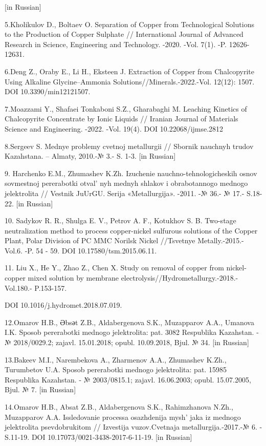 {[}in Russian{]}

5.Kholikulov D., Boltaev O. Separation of Copper from Technological
Solutions to the Production of Copper Sulphate // International Journal
of Advanced Research in Science, Engineering and Technology. -2020.
-Vol. 7(1). -P. 12626-12631.

6.Deng Z., Oraby E., Li H., Eksteen J. Extraction of Copper from
Chalcopyrite Using Alkaline Glycine--Ammonia
Solutions//Minerals.-2022.-Vol. 12(12): 1507. DOI 10.3390/min12121507.

7.Moazzami Y., Shafaei Tonkaboni S.Z., Gharabaghi M. Leaching Kinetics
of Chalcopyrite Concentrate by Ionic Liquids // Iranian Journal of
Materials Science and Engineering. -2022. -Vol. 19(4). DOI
10.22068/ijmse.2812

8.Sergeev S. Mednye problemy cvetnoj metallurgii // Sbornik nauchnyh
trudov Kazahstana. -- Almaty, 2010.-№ 3.- S. 1-3. {[}in Russian{]}

9. Harchenko E.M., Zhumashev K.Zh. Izuchenie nauchno-tehnologicheskih
osnov sovmestnoj pererabotki otval' nyh mednyh shlakov i
obrabotannogo mednogo jelektrolita // Vestnik JuUrGU. Serija
«Metallurgija». -2011. -№ 36.- № 17.- S.18-22. {[}in Russian{]}

10. Sadykov R. R., Shulga E. V., Petrov A. F., Kotukhov S. B. Two-stage
neutralization method to process copper-nickel sulfurous solutions of
the Copper Plant, Polar Division of PC MMC Norilsk Nickel //Tsvetnye
Metally.-2015.- Vol.6. -P. 54 - 59. DOI 10.17580/tsm.2015.06.11.

11. Liu X., He Y., Zhao Z., Chen X. Study on removal of copper from
nickel-copper mixed solution by membrane
electrolysis//Hydrometallurgy.-2018.-Vol.180.- P.153-157.

DOI 10.1016/j.hydromet.2018.07.019.

12.Omarov H.B., Әbsәt Z.B., Aldabergenova S.K., Muzapparov A.A., Umanova
I.K. Sposob pererabotki mednogo jelektrolita: pat. 3082 Respublika
Kazahstan. - № 2018/0029.2; zajavl. 15.01.2018; opubl. 10.09.2018, Bjul.
№ 34. {[}in Russian{]}

13.Bakeev M.I., Narembekova A., Zharmenov A.A., Zhumashev K.Zh.,
Turumbetov U.A. Sposob pererabotki mednogo jelektrolita: pat. 15985
Respublika Kazahstan. - № 2003/0815.1; zajavl. 16.06.2003; opubl.
15.07.2005, Bjul. № 7. {[}in Russian{]}

14.Omarov H.B., Absat Z.B., Aldabergenova S.K., Rahimzhanova N.Zh.,
Muzapparov A.A. Issledovanie processa osazhdenija
mysh' jaka iz mednogo jelektrolita psevdobrukitom //
Izvestija vuzov.Cvetnaja metallurgija.-2017.-№ 6. -S.11-19. DOI
10.17073/0021-3438-2017-6-11-19. {[}in Russian{]}

